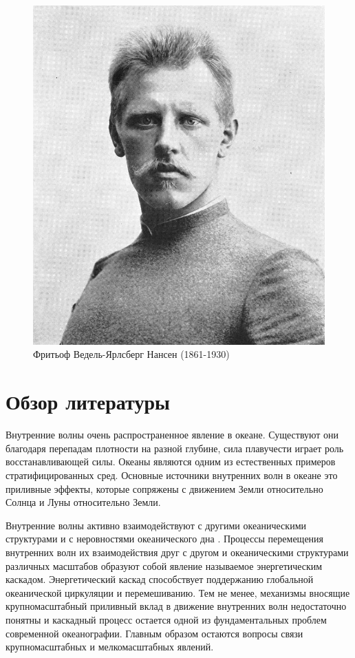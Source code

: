 \begin{figure}
    \centering
    \includegraphics[scale=2.5]{Figs/800px-Fridtjof_Nansen.jpg}
    \caption{Фритьоф Ведель-Ярлсберг Нансен (1861-1930)}
    \label{fig:Nansen}
\end{figure}

\section{Обзор литературы}

Внутренние волны очень распространенное явление в океане. Существуют они благодаря перепадам плотности на разной глубине, сила плавучести играет роль восстанавливающей силы. Океаны являются одним из естественных примеров стратифицированных сред. Основные источники внутренних волн в океане это приливные эффекты, которые сопряжены с движением Земли относительно Солнца и Луны относительно Земли.

Внутренние волны активно взаимодействуют с другими океаническими структурами \cite{Rainville2006} и с неровностями океанического дна \cite{DAUXOIS1999}. Процессы перемещения внутренних волн их взаимодействия друг с другом и океаническими структурами различных масштабов образуют собой явление называемое энергетическим каскадом\cite{Garrett1972}. Энергетический каскад способствует поддержанию глобальной океанической циркуляции и перемешиванию\cite{Nikurashin2012,Munk1998}. Тем не менее, механизмы вносящие крупномасштабный приливный вклад в движение внутренних волн недостаточно понятны \cite{Ivey2008,Polzin1997} и каскадный процесс остается одной из фундаментальных проблем современной океанографии. Главным образом остаются вопросы связи крупномасштабных и мелкомасштабных явлений.

